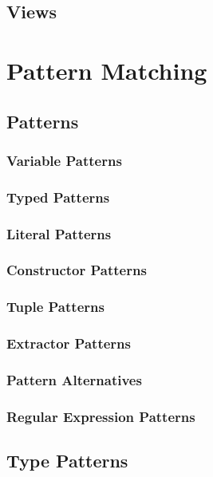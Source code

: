 \section{Views}

\chapter{Pattern Matching}

\section{Patterns}
\label{sec:patterns}

\subsection{Variable Patterns}

\subsection{Typed Patterns}

\subsection{Literal Patterns}

\subsection{Constructor Patterns}

\subsection{Tuple Patterns}

\subsection{Extractor Patterns}

\subsection{Pattern Alternatives}

\subsection{Regular Expression Patterns}

\section{Type Patterns}

